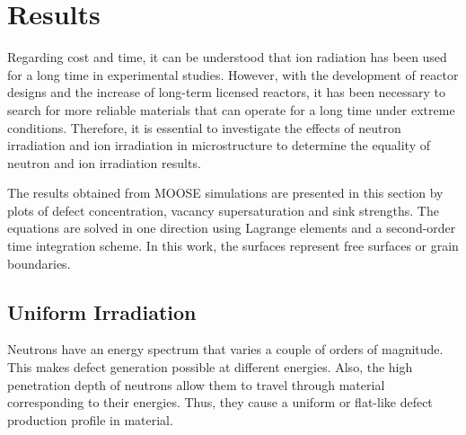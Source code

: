 \documentclass[utf8]{frontiersSCNS} %
\begin{document}


\section{Results}

    Regarding cost and time, it can be understood that ion radiation has been used for a long time in experimental studies. However, with the development of reactor designs and the increase of long-term licensed reactors, it has been necessary to search for more reliable materials that can operate for a long time under extreme conditions. Therefore, it is essential to investigate the effects of neutron irradiation and ion irradiation in microstructure to determine the equality of neutron and ion irradiation results.

    The results obtained from MOOSE simulations are presented in this section by plots of defect concentration, vacancy supersaturation and sink strengths. The equations are solved in one direction using Lagrange elements and a second-order time integration scheme. In this work, the surfaces represent free surfaces or grain boundaries.\\ %

\subsection{Uniform Irradiation}
    Neutrons have an energy spectrum that varies a couple of orders of magnitude. This makes defect generation possible at different energies. Also, the high penetration depth of neutrons allow them to travel through material corresponding to their energies. Thus, they cause a uniform or flat-like defect production profile in material. \citep{was2017}
\end{document}
